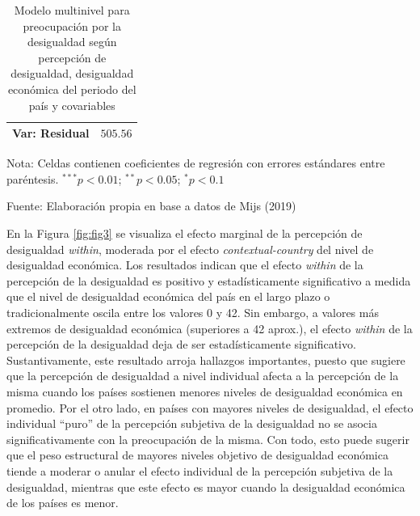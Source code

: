 \documentclass[
  12pt,
  a4paper,
]{article}
\begin{document}
\begin{table}[H]
\begin{center}
{\begin{threeparttable}
\begin{tabular}{l c}
Var: Residual                                                                                     & $505.56$      \\
\bottomrule
\end{tabular}
\begin{tablenotes}[flushleft]
\scriptsize{\item Nota: Celdas contienen coeficientes de regresión con errores estándares entre paréntesis. $^{***}p<0.01$; $^{**}p<0.05$; $^{*}p<0.1$ \\ \item Fuente: Elaboración propia en base a datos de Mijs (2019)}
\end{tablenotes}
\end{threeparttable}
}
\caption{\label{tab:table6} Modelo multinivel para preocupación por la desigualdad según percepción de desigualdad, desigualdad económica del periodo del país y covariables}
\label{table:coefficients}
\end{center}
\end{table}

En la Figura \ref{fig:fig3} se visualiza el efecto marginal de la percepción de desigualdad \emph{within}, moderada por el efecto \emph{contextual-country} del nivel de desigualdad económica. Los resultados indican que el efecto \emph{within} de la percepción de la desigualdad es positivo y estadísticamente significativo a medida que el nivel de desigualdad económica del país en el largo plazo o tradicionalmente oscila entre los valores 0 y 42. Sin embargo, a valores más extremos de desigualdad económica (superiores a 42 aprox.), el efecto \emph{within} de la percepción de la desigualdad deja de ser estadísticamente significativo. Sustantivamente, este resultado arroja hallazgos importantes, puesto que sugiere que la percepción de desigualdad a nivel individual afecta a la percepción de la misma cuando los países sostienen menores niveles de desigualdad económica en promedio. Por el otro lado, en países con mayores niveles de desigualdad, el efecto individual ``puro'' de la percepción subjetiva de la desigualdad no se asocia significativamente con la preocupación de la misma. Con todo, esto puede sugerir que el peso estructural de mayores niveles objetivo de desigualdad económica tiende a moderar o anular el efecto individual de la percepción subjetiva de la desigualdad, mientras que este efecto es mayor cuando la desigualdad económica de los países es menor.
\end{document}
